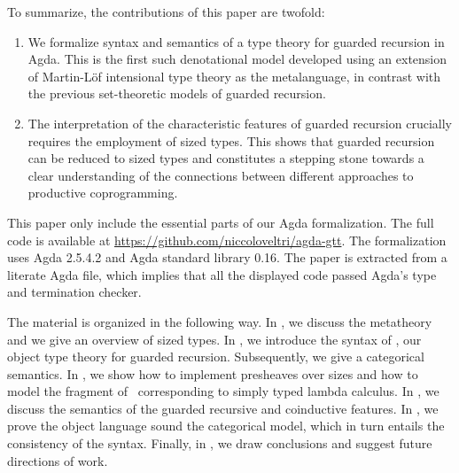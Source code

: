 To summarize, the contributions of this paper are twofold:
\begin{enumerate}
  \item We formalize syntax and semantics of a type theory for
    guarded recursion in Agda. This is the first such denotational model developed using an extension of Martin-L\"of intensional
    type theory as the metalanguage, in contrast with the previous
    set-theoretic models of guarded recursion.
\item The interpretation of the characteristic features of guarded
  recursion crucially requires the employment of sized types. This shows that
  guarded recursion can be reduced to sized types and
  constitutes a stepping stone towards a clear understanding of  the connections
  between different approaches to productive coprogramming.
\end{enumerate}

This paper only include the essential parts of our Agda
formalization. The full code is available at
\url{https://github.com/niccoloveltri/agda-gtt}. The formalization
uses Agda 2.5.4.2 and Agda standard library 0.16. The paper is
extracted from a literate Agda file, which implies that all the
displayed code passed Agda's type and termination checker.

The material is organized in the following way.
In , we discuss the metatheory and we give an
overview of sized types.
In , we introduce the syntax of \GTT, our object type theory for guarded recursion.
Subsequently, we give a categorical semantics.
In , we show how to implement presheaves over
sizes and how to model the fragment of
\GTT\ corresponding to simply typed lambda calculus.
In , we discuss the semantics of the guarded
recursive and coinductive features.
In , we prove the object language sound \wrt the
categorical model,
which in turn entails the consistency of the syntax.
Finally, in , we draw conclusions and suggest  future
directions of work.



